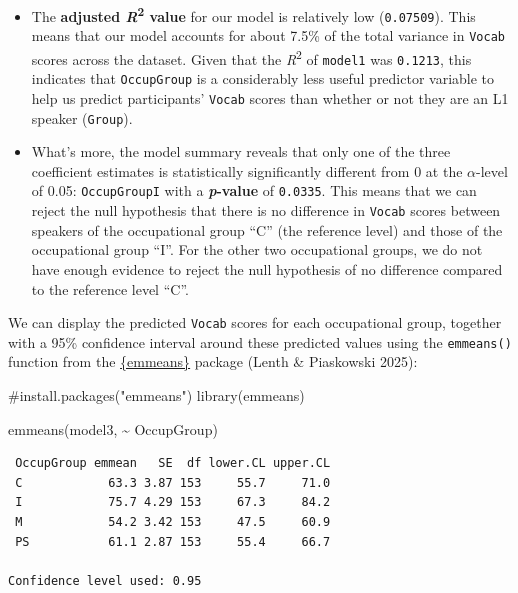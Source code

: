 \documentclass[
  letterpaper,
  DIV=11,
  numbers=noendperiod]{scrreprt}
\newenvironment{Shaded}{\begin{snugshade}}{\end{snugshade}}
\newcommand{\CommentTok}[1]{\textcolor[rgb]{0.37,0.37,0.37}{#1}}
\newcommand{\FunctionTok}[1]{\textcolor[rgb]{0.28,0.35,0.67}{#1}}
\newcommand{\NormalTok}[1]{\textcolor[rgb]{0.00,0.23,0.31}{#1}}
\newcommand{\SpecialCharTok}[1]{\textcolor[rgb]{0.37,0.37,0.37}{#1}}
\begin{document}
\begin{itemize}
  Participants who have manual jobs (``M'') are predicted to score
  \texttt{-9.133} points fewer than those in clerical positions, and
  so-called ``professionals'' (``PS'') will do slightly worse than than
  those in clerical professors (``C'' \texttt{-2.261} points). Compare
  these predicted values to those observed in the data shown in
  Figure~\ref{fig-VocabByOccupation}.
\item
  The \textbf{adjusted \emph{R}\textsuperscript{2} value} for our model
  is relatively low (\texttt{0.07509}). This means that our model
  accounts for about 7.5\% of the total variance in \texttt{Vocab}
  scores across the dataset. Given that the \emph{R}\textsuperscript{2}
  of \texttt{model1} was \texttt{0.1213}, this indicates that
  \texttt{OccupGroup} is a considerably less useful predictor variable
  to help us predict participants' \texttt{Vocab} scores than whether or
  not they are an L1 speaker (\texttt{Group}).
\item
  What's more, the model summary reveals that only one of the three
  coefficient estimates is statistically significantly different from 0
  at the \(\alpha\)-level of 0.05: \texttt{OccupGroupI} with a
  \textbf{\emph{p}-value} of \texttt{0.0335}. This means that we can
  reject the null hypothesis that there is no difference in
  \texttt{Vocab} scores between speakers of the occupational group ``C''
  (the reference level) and those of the occupational group ``I''. For
  the other two occupational groups, we do not have enough evidence to
  reject the null hypothesis of no difference compared to the reference
  level ``C''.
\end{itemize}

We can display the predicted \texttt{Vocab} scores for each occupational
group, together with a 95\% confidence interval around these predicted
values using the \texttt{emmeans()} function from the
\href{https://rvlenth.github.io/emmeans/index.html}{\{emmeans\}} package
(Lenth \& Piaskowski 2025):

\begin{Shaded}
\begin{Highlighting}[]
\CommentTok{\#install.packages("emmeans")}
\FunctionTok{library}\NormalTok{(emmeans)}

\FunctionTok{emmeans}\NormalTok{(model3, }\SpecialCharTok{\textasciitilde{}}\NormalTok{ OccupGroup)}
\end{Highlighting}
\end{Shaded}

\begin{verbatim}
 OccupGroup emmean   SE  df lower.CL upper.CL
 C            63.3 3.87 153     55.7     71.0
 I            75.7 4.29 153     67.3     84.2
 M            54.2 3.42 153     47.5     60.9
 PS           61.1 2.87 153     55.4     66.7

Confidence level used: 0.95 
\end{verbatim}
\end{document}
